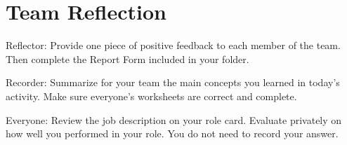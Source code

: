 \section*{Team Reflection}

Reflector: Provide one piece of positive feedback to each member of the team. Then complete the Report Form included in your folder.

\vspace{1ex}

Recorder: Summarize for your team the main concepts you learned in today's activity. Make sure everyone's worksheets are correct and complete.

\vspace{1ex}

Everyone: Review the job description on your role card. Evaluate privately on how well you performed in your role. You do not need to record your answer.

